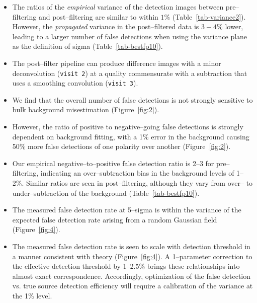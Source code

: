 \documentclass[iop]{emulateapj}
\begin{document}
\begin{itemize}
\item The ratios of the {\it empirical} variance of the detection images between pre--filtering and post--filtering are similar to within $1\%$ (Table~\ref{tab-variance2}).
  However, the {\it propagated} variance in the post--filtered data is $3-4\%$ lower, leading to a larger number of false detections when using the variance plane as the definition of sigma (Table~\ref{tab-bestfp10}).



\item The post--filter pipeline can produce difference images with a minor deconvolution ({\tt visit 2}) at a quality commensurate with a subtraction that uses a smoothing convolution ({\tt visit 3}).


\item We find that the overall number of false detections is not strongly sensitive to bulk background misestimation (Figure~\ref{fig:2}).

\item However, the ratio of positive to negative--going false detections is strongly dependent on background fitting, with a 1\% error in the background causing 50\% more false detections of one polarity over another (Figure~\ref{fig:2}).

\item Our empirical negative--to--positive false detection ratio is 2--3 for pre--filtering, indicating an over--subtraction bias in the background levels of 1--2\%.
  Similar ratios are seen in post--filtering, although they vary from over-- to under--subtraction of the background (Table~\ref{tab-bestfp10}).


\item The measured false detection rate at 5--sigma is within the variance of the expected false detection rate arising from a random Gaussian field (Figure~\ref{fig:4}).

\item The measured false detection rate is seen to scale with detection threshold in a manner consistent with theory (Figure~\ref{fig:4}).
  A 1--parameter correction to the effective detection threshold by 1--2.5\% brings these relationships into almost exact correspondence.
  Accordingly, optimization of the false detection vs. true source detection efficiency will require a calibration of the variance at the 1\% level.

\end{itemize}
\end{document}

